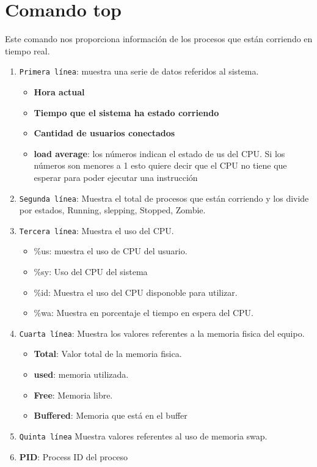 \documentclass{article}
\begin{document}
	\section{Comando top}
	Este comando nos proporciona información de los procesos que están corriendo en tiempo real.
	\begin{enumerate}
		\item \texttt{Primera línea}: muestra una serie de datos referidos al sistema.
		\begin{itemize}
			\item \textbf{Hora actual}
			\item \textbf{Tiempo que el sistema ha estado corriendo}
			\item \textbf{Cantidad de usuarios conectados}
			\item \textbf{load average}: los números indican el estado de us del CPU. Si los números son menores a 1 esto quiere decir que el CPU no tiene que esperar para poder ejecutar una instrucción
		\end{itemize}
	\item \texttt{Segunda línea}: Muestra el total de procesos que están corriendo y los divide por estados, Running, slepping, Stopped, Zombie.
	\item \texttt{Tercera línea}: Muestra el uso del CPU.
	\begin{itemize}
		\item \%us: muestra el uso de CPU del usuario.
		\item \%sy: Uso del CPU del sistema
		\item \%id: Muestra el uso del CPU disponoble para utilizar.
		\item \%wa: Muestra en porcentaje el tiempo en espera del CPU. 
	\end{itemize}
	\item \texttt{Cuarta línea}: Muestra los valores referentes a la memoria fisica del equipo.
	\begin{itemize}
		\item \textbf{Total}: Valor total de la memoria fisica.
		\item \textbf{used}: memoria utilizada.
		\item \textbf{Free}: Memoria libre.
		\item \textbf{Buffered}: Memoria que está en el buffer
	\end{itemize}
	\item \texttt{Quinta línea}
	Muestra valores referentes al uso de memoria swap.
	\item \textbf{PID}: Process ID del proceso

\end{enumerate}
\end{document}
